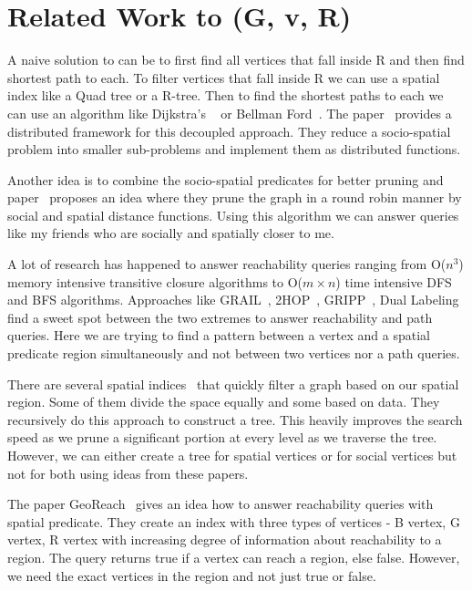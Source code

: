\section{Related Work to {\rrp}(G, v, R)} \label{sec:relwork}
A naive solution to {\rrp} can be to first find all vertices that fall inside R and then find shortest path to each. To filter vertices that fall inside R we can use a spatial index like a Quad tree or a R-tree. Then to find the shortest paths to each we can use an algorithm like Dijkstra's ~\cite{S1990} or Bellman Ford~\cite{R1956}. The paper~\cite{NSD2013} provides a distributed framework for this decoupled approach. They reduce a socio-spatial problem into smaller sub-problems and implement them as distributed functions.

Another idea is to combine the socio-spatial predicates for better pruning and paper~\cite{KJY+2015} proposes an idea where they prune the graph in a round robin manner by social and spatial distance functions. Using this algorithm we can answer queries like my friends who are socially and spatially closer to me.

{A lot of research has happened to answer reachability queries ranging from O($n^3$}{) memory intensive transitive closure algorithms to O($m \times n$) time intensive DFS and BFS algorithms. Approaches like GRAIL~\cite{YCZ+2010}, 2HOP~\cite{CHK+2003}, GRIPP~\cite{SU2007}, Dual Labeling~\cite{HHJ+2006} find a sweet spot between the two extremes to answer reachability and path queries. Here we are trying to find a pattern between a vertex and a spatial predicate region simultaneously and not between two vertices nor a path queries. }

There are several spatial indices~\cite{PMA2001,H2006,SS2003} that quickly filter a graph based on our spatial region. Some of them divide the space equally and some based on data. They recursively do this approach to construct a tree. This heavily improves the search speed as we prune a significant portion at every level as we traverse the tree. However, we can either create a tree for spatial vertices or for social vertices but not for both using ideas from these papers.

The paper GeoReach~\cite{YM2016} gives an idea how to answer reachability queries with spatial predicate. They create an index with three types of vertices - B vertex, G vertex, R vertex with increasing degree of information about reachability to a region. The query returns true if a vertex can reach a region, else false. However, we need the exact vertices in the region and not just true or false.
